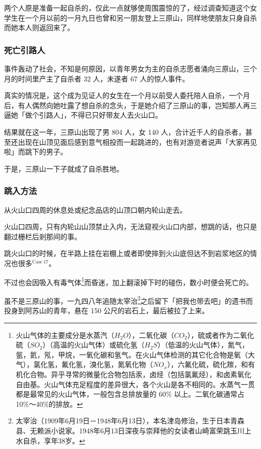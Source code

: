 \documentclass[UTF8]{ctexart}
\begin{document}
两个人原是准备一起自杀的，仅此一点就够使周围震惊的了，经过调查知道这个女学生在一个月以前的一月九日也曾和另一朋友登上三原山，同样地使朋友只身自杀而她本人则返回来了。

\subsubsection*{死亡引路人}

事件轰动了社会，不知是何原因，以青年男女为主的自杀志愿者涌向三原山，三个月的时间里产主了自杀者 32 人，未遂者 67 人的惊人事件。

真实的情况是，这个成为见证人的女生在一个月以前受人委托陪人自杀，一个月后，有人偶然向她吐露了想自杀的念头，于是她介绍了三原山的事，岂知那人再三逼她「做个引路人」，不得已只好带友人去火山口。

结果就在这一年，三原山出现了男 804 人，女 140 人，合计近千人的自杀者，甚至还出现在山顶见面后感到意气相投而一起跳进的，也有对游览者说声「大家再见啦」而跳下的男子。

于是，三原山一下子就成了自杀胜地。

\subsubsection*{跳入方法}

从火山口四周的休息处或纪念品店的山顶口朝内轮山走去。

火山口四周，只有内轮山山顶禁止入内，无法窥视火山口内部，想跳的话，也只是翻过栅栏后剎那间的事。 

跳火山口的时候，在半路上挂在岩棚上或者即使摔到火山底但达不到岩浆地区的情况也很多$^{\mathrm{Case\ 17}}$。

不过也会因吸入有毒气体\footnote{火山气体的主要成分是水蒸汽（$H_2O$），二氧化碳（$CO_2$），硫或者作为二氧化硫（$SO_2$）（高温的火山气体）或硫化氢（$H_2S$）（低温的火山气体），氮气，氩，氦，氖，甲烷，一氧化碳和氢气。在火山气体检测的其它化合物是氧（大气），氯化氢，氟化氢，溴化氢，氮氧化物（$NO_x$），六氟化硫，硫化羰，和有机化合物。异乎寻常的微量化合物包括汞，卤烃（包括氯氟烃），和卤素氧化自由基。火山气体充足程度的差异很大，各个火山是各不相同的。水蒸气一贯都是最常见的火山气体，一般包含总排放量的 60\% 以上。二氧化碳通常占 10\%～40\%的排放。}而昏迷，加上翻滚掉下时的碰伤，数小时便会死亡的。 

虽不是三原山的事，一九四八年追随太宰治\footnote{太宰治（1909年6月19日－1948年6月13日），本名津岛修治，生于日本青森县、无赖派小说家。1948年6月13日深夜与崇拜他的女读者山崎富荣跳玉川上水自杀，享年38岁。}之后留下「把我也带去吧」的遗书而投身到阿苏山的青年，悬在 150 公尺的岩石上，最后被拉了上来。
\end{document}
